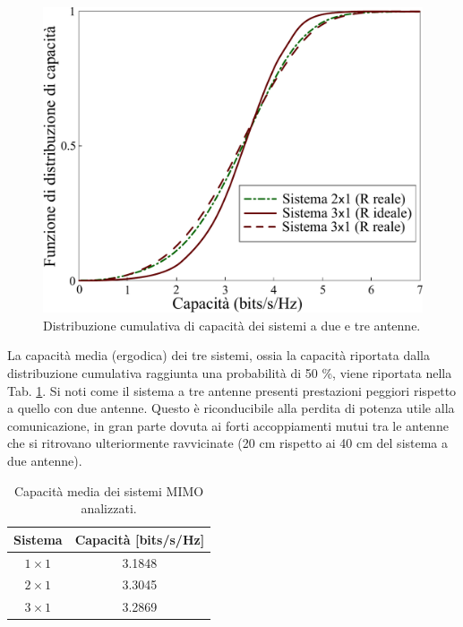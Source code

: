 \documentclass[technote]{IEEEtran}
\begin{document}
\begin{figure}[!ht]
\centering
\includegraphics[width=0.8\columnwidth]{figure37}
\caption{Distribuzione cumulativa di capacità dei sistemi a due e tre antenne.}
\label{fig:37}
\end{figure}
La capacità media (ergodica) dei tre sistemi, ossia la capacità riportata dalla distribuzione cumulativa raggiunta una probabilità di 50 \%, viene riportata nella Tab. \ref{tab:sistemi}. Si noti come il sistema a tre antenne presenti prestazioni peggiori rispetto a quello con due antenne. Questo è riconducibile alla perdita di potenza utile alla comunicazione, in gran parte dovuta ai forti accoppiamenti mutui tra le antenne che si ritrovano ulteriormente ravvicinate (20 cm rispetto ai 40 cm del sistema a due antenne).
\begin{table}[h!]
\begin{center}
\begin{tabular}{|c|c|}
\hline
Sistema & Capacità [bits/s/Hz] \\ \hline \hline
$1 \times 1$ & 3.1848 \\ \hline
$2 \times 1$ & 3.3045 \\ \hline
$3 \times 1$ & 3.2869 \\ \hline
\end{tabular}
\end{center}
\caption{Capacità media dei sistemi MIMO analizzati.}
\label{tab:sistemi}
\end{table}

\end{document}

